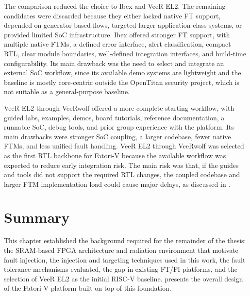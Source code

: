 The comparison reduced the choice to Ibex and VeeR EL2. The remaining candidates were discarded because they either lacked native \ac{FT} support, depended on generator-based flows, targeted larger application-class systems, or provided limited \ac{SoC} infrastructure. Ibex offered stronger \ac{FT} support, with multiple native \acp{FTM}, a defined error interface, alert classification, compact \ac{RTL}, clear module boundaries, well-defined integration interfaces, and build-time configurability. Its main drawback was the need to select and integrate an external \ac{SoC} workflow, since its available demo systems are lightweight and the baseline is mostly core-centric outside the OpenTitan security project, which is not suitable as a general-purpose baseline.

VeeR EL2 through VeeRwolf offered a more complete starting workflow, with guided labs, examples, demos, board tutorials, reference documentation, a runnable \ac{SoC}, debug tools, and prior group experience with the platform. Its main drawbacks were stronger \ac{SoC} coupling, a larger codebase, fewer native \acp{FTM}, and less unified fault handling. VeeR EL2 through VeeRwolf was selected as the first \ac{RTL} backbone for \ac{Fatori-V} because the available workflow was expected to reduce early integration risk. The main risk was that, if the guides and tools did not support the required \ac{RTL} changes, the coupled codebase and larger \ac{FTM} implementation load could cause major delays, as discussed in .

\section{Summary}
\label{chap2:summary}

This chapter established the background required for the remainder of the thesis: the \ac{SRAM}-based \ac{FPGA} architecture and radiation environment that motivate fault injection, the injection and targeting techniques used in this work, the fault tolerance mechanisms evaluated, the gap in existing \ac{FT}/\ac{FI} platforms, and the selection of VeeR EL2 as the initial \ac{RISC-V} baseline.  presents the overall design of the \ac{Fatori-V} platform built on top of this foundation.

